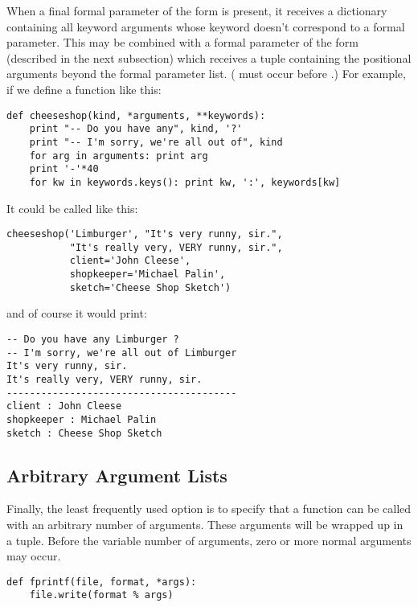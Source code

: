 \documentclass{manual}
\begin{document}
When a final formal parameter of the form  is
present, it receives a dictionary containing all keyword arguments
whose keyword doesn't correspond to a formal parameter.  This may be
combined with a formal parameter of the form 
(described in the next subsection) which receives a tuple containing
the positional arguments beyond the formal parameter list.
( must occur before .)  For
example, if we define a function like this:

\begin{verbatim}
def cheeseshop(kind, *arguments, **keywords):
    print "-- Do you have any", kind, '?'
    print "-- I'm sorry, we're all out of", kind
    for arg in arguments: print arg
    print '-'*40
    for kw in keywords.keys(): print kw, ':', keywords[kw]
\end{verbatim}

It could be called like this:

\begin{verbatim}
cheeseshop('Limburger', "It's very runny, sir.",
           "It's really very, VERY runny, sir.",
           client='John Cleese',
           shopkeeper='Michael Palin',
           sketch='Cheese Shop Sketch')
\end{verbatim}

and of course it would print:

\begin{verbatim}
-- Do you have any Limburger ?
-- I'm sorry, we're all out of Limburger
It's very runny, sir.
It's really very, VERY runny, sir.
----------------------------------------
client : John Cleese
shopkeeper : Michael Palin
sketch : Cheese Shop Sketch
\end{verbatim}

\subsection{Arbitrary Argument Lists}
\label{arbitraryArgs}

Finally, the least frequently used option is to specify that a
function can be called with an arbitrary number of arguments.  These
arguments will be wrapped up in a tuple.  Before the variable number
of arguments, zero or more normal arguments may occur.

\begin{verbatim}
def fprintf(file, format, *args):
    file.write(format % args)
\end{verbatim}
\end{document}
